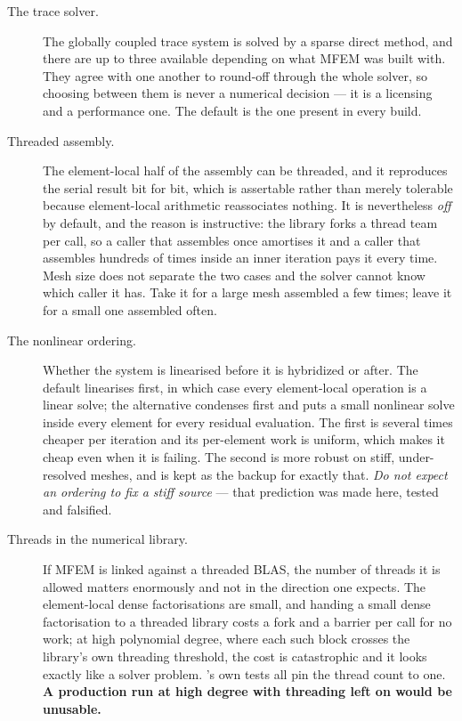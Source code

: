 \begin{description}

\item[The trace solver.] The globally coupled trace system is solved by a sparse
	direct method, and there are up to three available depending on what MFEM
	was built with. They agree with one another to round-off through the whole
	solver, so choosing between them is never a numerical decision --- it is a
	licensing and a performance one. The default is the one present in every
	build.

\item[Threaded assembly.] The element-local half of the assembly can be
	threaded, and it reproduces the serial result bit for bit, which is
	assertable rather than merely tolerable because element-local arithmetic
	reassociates nothing. It is nevertheless \emph{off} by default, and the
	reason is instructive: the library forks a thread team per call, so a caller
	that assembles once amortises it and a caller that assembles hundreds of
	times inside an inner iteration pays it every time. Mesh size does not
	separate the two cases and the solver cannot know which caller it has. Take
	it for a large mesh assembled a few times; leave it for a small one
	assembled often.

\item[The nonlinear ordering.] Whether the system is linearised before it is
	hybridized or after. The default linearises first, in which case every
	element-local operation is a linear solve; the alternative condenses first
	and puts a small nonlinear solve inside every element for every residual
	evaluation. The first is several times cheaper per iteration and its
	per-element work is uniform, which makes it cheap even when it is failing.
	The second is more robust on stiff, under-resolved meshes, and is kept as
	the backup for exactly that. \emph{Do not expect an ordering to fix a stiff
	source} --- that prediction was made here, tested and falsified.

\item[Threads in the numerical library.] If MFEM is linked against a threaded
	BLAS, the number of threads it is allowed matters enormously and not in the
	direction one expects. The element-local dense factorisations are small, and
	handing a small dense factorisation to a threaded library costs a fork and a
	barrier per call for no work; at high polynomial degree, where each such
	block crosses the library's own threading threshold, the cost is
	catastrophic and it looks exactly like a solver problem. {\meq}'s own tests
	all pin the thread count to one. \textbf{A production run at high degree
	with threading left on would be unusable.}

\end{description}

